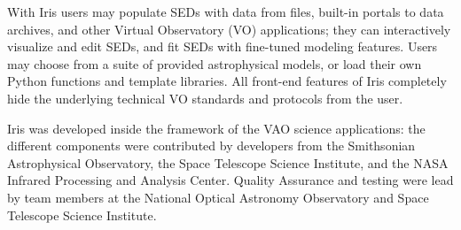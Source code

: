 \documentclass[final,5p]{elsarticle}
\begin{document}
With Iris users may populate SEDs with data from files, built-in portals to data archives, and other Virtual Observatory (VO) applications; they can interactively visualize and edit SEDs, and fit SEDs with fine-tuned modeling features. Users may choose from a suite of provided astrophysical models, or load their own Python functions and template libraries. All front-end features of Iris completely hide the underlying technical VO standards and protocols from the user.




Iris was developed inside the framework of the VAO science applications: the different components were contributed by developers from the Smithsonian Astrophysical Observatory, the Space Telescope Science Institute, and the NASA Infrared Processing and Analysis Center. Quality Assurance and testing were lead by team members at the National Optical Astronomy Observatory and Space Telescope Science Institute.
\end{document}
